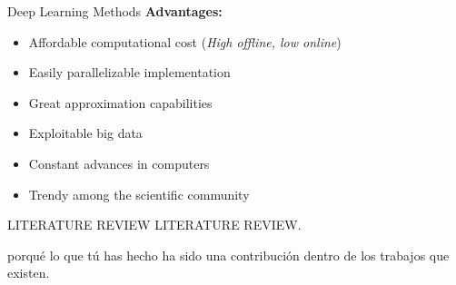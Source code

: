 \begin{frame}{Deep Learning Methods}
\textbf{Advantages:}
\vspace{0.4cm}
\begin{itemize}
\item Affordable computational cost (\textit{High offline, low online})
\vspace{0.4cm}
\item Easily parallelizable implementation
\vspace{0.4cm}
\item Great approximation capabilities
\vspace{0.4cm}
\item Exploitable big data
\vspace{0.4cm}
\item Constant advances in computers
\vspace{0.4cm}
\item Trendy among the scientific community
\end{itemize}
\end{frame}


\begin{frame}{LITERATURE REVIEW}
LITERATURE REVIEW.

porqué lo que tú has hecho ha sido una contribución dentro de los trabajos que existen.
\end{frame}